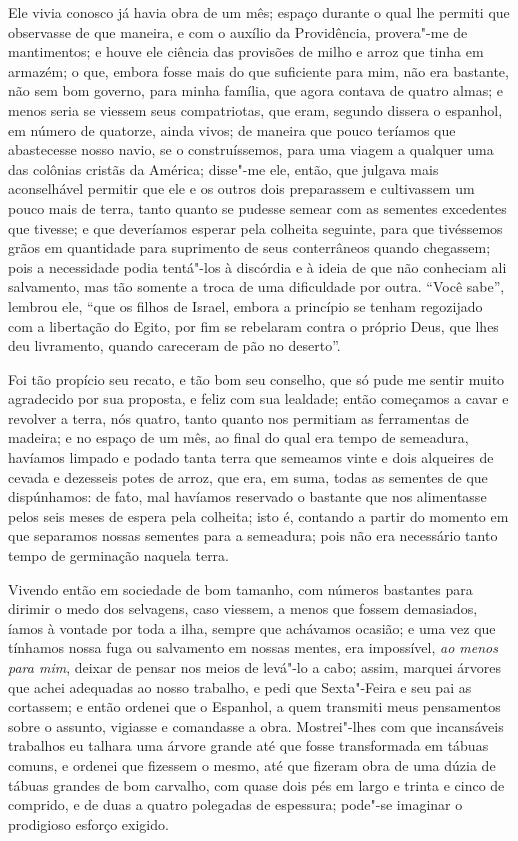 Ele vivia conosco já havia obra de um mês; espaço durante o qual lhe
permiti que observasse de que maneira, e com o auxílio da Providência,
provera"-me de mantimentos; e houve ele ciência das provisões de milho e
arroz que tinha em armazém; o que, embora fosse mais do que suficiente
para mim, não era bastante, não sem bom governo, para minha família, que
agora contava de quatro almas; e menos seria se viessem seus
compatriotas, que eram, segundo dissera o espanhol, em número de
quatorze, ainda vivos; de maneira que pouco teríamos que abastecesse
nosso navio, se o construíssemos, para uma viagem a qualquer uma das
colônias cristãs da América; disse"-me ele, então, que julgava mais
aconselhável permitir que ele e os outros dois preparassem e cultivassem
um pouco mais de terra, tanto quanto se pudesse semear com as sementes
excedentes que tivesse; e que deveríamos esperar pela colheita seguinte,
para que tivéssemos grãos em quantidade para suprimento de seus
conterrâneos quando chegassem; pois a necessidade podia tentá"-los à
discórdia e à ideia de que não conheciam ali salvamento, mas tão somente
a troca de uma dificuldade por outra. ``Você sabe'', lembrou ele, ``que
os filhos de Israel, embora a princípio se tenham regozijado com a
libertação do Egito, por fim se rebelaram contra o próprio Deus, que
lhes deu livramento, quando careceram de pão no deserto''.

Foi tão propício seu recato, e tão bom seu conselho, que só pude me
sentir muito agradecido por sua proposta, e feliz com sua lealdade;
então começamos a cavar e revolver a terra, nós quatro, tanto quanto nos
permitiam as ferramentas de madeira; e no espaço de um mês, ao final do
qual era tempo de semeadura, havíamos limpado e podado tanta terra que
semeamos vinte e dois alqueires de cevada e dezesseis potes de arroz,
que era, em suma, todas as sementes de que dispúnhamos: de fato, mal
havíamos reservado o bastante que nos alimentasse pelos seis meses de
espera pela colheita; isto é, contando a partir do momento em que
separamos nossas sementes para a semeadura; pois não era necessário
tanto tempo de germinação naquela terra.

Vivendo então em sociedade de bom tamanho, com números bastantes para
dirimir o medo dos selvagens, caso viessem, a menos que fossem
demasiados, íamos à vontade por toda a ilha, sempre que achávamos
ocasião; e uma vez que tínhamos nossa fuga ou salvamento em nossas
mentes, era impossível, \emph{ao menos para mim}, deixar de pensar nos
meios de levá"-lo a cabo; assim, marquei árvores que achei adequadas ao
nosso trabalho, e pedi que Sexta"-Feira e seu pai as cortassem; e então
ordenei que o Espanhol, a quem transmiti meus pensamentos sobre o
assunto, vigiasse e comandasse a obra. Mostrei"-lhes com que incansáveis
trabalhos eu talhara uma árvore grande até que fosse transformada em
tábuas comuns, e ordenei que fizessem o mesmo, até que fizeram obra de
uma dúzia de tábuas grandes de bom carvalho, com quase dois pés em largo
e trinta e cinco de comprido, e de duas a quatro polegadas de espessura;
pode"-se imaginar o prodigioso esforço exigido.

